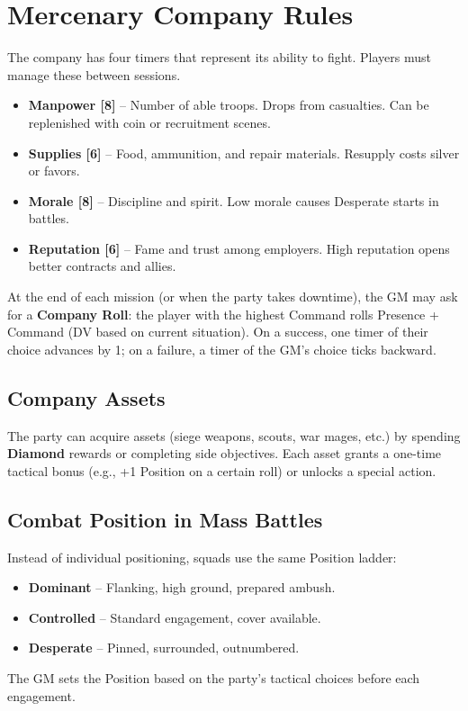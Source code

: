 \documentclass[11pt]{article}
\newcommand{\Term}[1]{\textbf{#1}}
\newcommand{\Diamond}{\Term{Diamond}}
\begin{document}
\section*{Mercenary Company Rules}

The company has four timers that represent its ability to fight. Players must manage these between sessions.

\begin{itemize}
\item \textbf{Manpower [8]} -- Number of able troops. Drops from casualties. Can be replenished with coin or recruitment scenes.
\item \textbf{Supplies [6]} -- Food, ammunition, and repair materials. Resupply costs silver or favors.
\item \textbf{Morale [8]} -- Discipline and spirit. Low morale causes Desperate starts in battles.
\item \textbf{Reputation [6]} -- Fame and trust among employers. High reputation opens better contracts and allies.
\end{itemize}

At the end of each mission (or when the party takes downtime), the GM may ask for a \textbf{Company Roll}: the player with the highest Command rolls Presence + Command (DV based on current situation). On a success, one timer of their choice advances by 1; on a failure, a timer of the GM's choice ticks backward.

\subsection*{Company Assets}
The party can acquire assets (siege weapons, scouts, war mages, etc.) by spending \Diamond{} rewards or completing side objectives. Each asset grants a one-time tactical bonus (e.g., +1 Position on a certain roll) or unlocks a special action.

\subsection*{Combat Position in Mass Battles}
Instead of individual positioning, squads use the same Position ladder:
\begin{itemize}
\item \textbf{Dominant} -- Flanking, high ground, prepared ambush.
\item \textbf{Controlled} -- Standard engagement, cover available.
\item \textbf{Desperate} -- Pinned, surrounded, outnumbered.
\end{itemize}
The GM sets the Position based on the party's tactical choices before each engagement.
\end{document}
